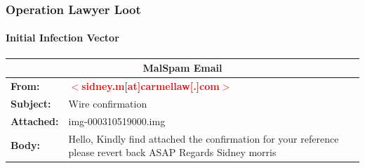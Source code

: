 \documentclass[aspectratio=169]{beamer}
\begin{document}
{
\begin{frame}
  \frametitle{Operation Lawyer Loot}
  \framesubtitle{Initial Infection Vector}
  \begin{tabularx}{\textwidth}{ |X|X| }
    \hline
    \multicolumn{2}{|c|}{\textbf{MalSpam Email}} \\
    \hline
    \textbf{From:} & \textbf{\textcolor{red}{$<$sidney.m[at]carmellaw[.]com$>$}} \\
    \hline
    \textbf{Subject:} & Wire confirmation \\
    \hline
    \textbf{Attached:} & img-000310519000.img \\
    \hline
    \textbf{Body:} & Hello,
    \newline
    \newline
    Kindly find attached the confirmation for your reference
    \newline
    \newline
    please revert back ASAP
    \newline
    \newline
    Regards
    \newline
    \newline
    Sidney morris \\
    \hline
  \end{tabularx}
\end{frame}
}
\end{document}
